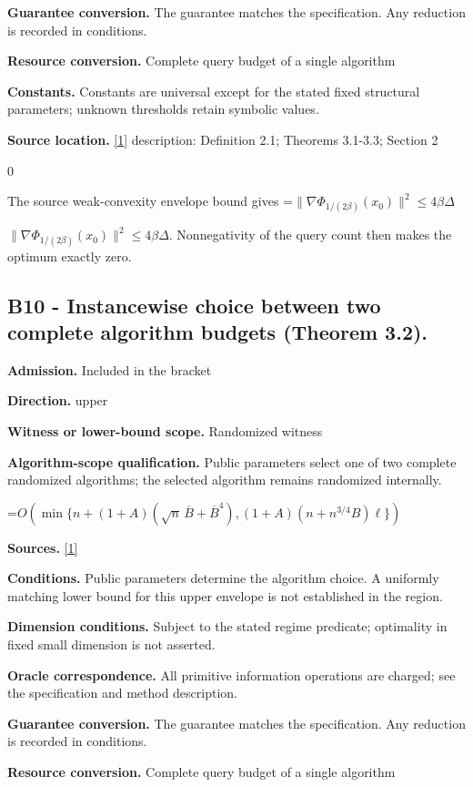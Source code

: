 \documentclass[10pt,a4paper]{article}
\newcommand{\AtlasMath}[1]{\par\begingroup\centering\setbox0=\hbox{$\displaystyle #1$}\ifdim\wd0>1.4\linewidth\typeout{ATLAS WIDE FORMULA: \the\wd0}\fi\ifdim\wd0>\linewidth\resizebox{\linewidth}{!}{\box0}\else\box0\fi\par\endgroup}
\newcommand{\AtlasInlineMath}[1]{\begingroup\setbox0=\hbox{$#1$}\ifdim\wd0>.4\linewidth\endgroup\AtlasMath{#1}\else\endgroup$#1$\fi}
\begin{document}
\textbf{Guarantee conversion.} The guarantee matches the specification. Any reduction is recorded in conditions.

\textbf{Resource conversion.} Complete query budget of a single algorithm

\textbf{Constants.} Constants are universal except for the stated fixed structural parameters; unknown thresholds retain symbolic values.

\textbf{Source location.} \href{https://arxiv.org/pdf/2610.16991v2}{[1]} description: Definition 2.1; Theorems 3.1-3.3; Section 2

0

The source weak-convexity envelope bound gives \AtlasInlineMath{\|\nabla\Phi_{1/(2\beta)}(x_0)\|^2\le4\beta\Delta}. Nonnegativity of the query count then makes the optimum exactly zero.

\subsection{B10 - Instancewise choice between two complete algorithm budgets (Theorem 3.2).}
\textbf{Admission.} Included in the bracket

\textbf{Direction.} upper

\textbf{Witness or lower-bound scope.} Randomized witness

\textbf{Algorithm-scope qualification.} Public parameters select one of two complete randomized algorithms; the selected algorithm remains randomized internally.

\AtlasMath{O\!\left(\min\{n+(1+A)(\sqrt n\,\overline B+\overline B^4),(1+A)(n+n^{3/4}B)\ell\}\right)}
\textbf{Sources.} \href{https://arxiv.org/pdf/2610.16991v2}{[1]}

\textbf{Conditions.} Public parameters determine the algorithm choice. A uniformly matching lower bound for this upper envelope is not established in the region.

\textbf{Dimension conditions.} Subject to the stated regime predicate; optimality in fixed small dimension is not asserted.

\textbf{Oracle correspondence.} All primitive information operations are charged; see the specification and method description.

\textbf{Guarantee conversion.} The guarantee matches the specification. Any reduction is recorded in conditions.

\textbf{Resource conversion.} Complete query budget of a single algorithm
\end{document}
